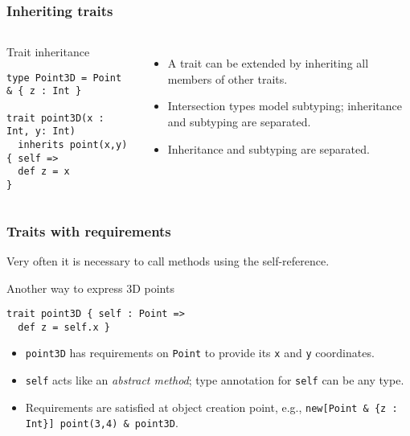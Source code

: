 \documentclass{beamer}
\begin{document}
\begin{frame}[fragile]
  \frametitle{Inheriting traits}

\begin{columns}[t]

\begin{exampleblock}{Trait inheritance}
\begin{lstlisting}
type Point3D = Point & { z : Int }

trait point3D(x : Int, y: Int)
  inherits point(x,y) { self =>
  def z = x
}
\end{lstlisting}

\end{exampleblock}




\begin{itemize}
\item A trait can be extended by inheriting all members of other traits.
\item Intersection types model subtyping; inheritance and subtyping are
  separated.
\item Inheritance and subtyping are separated.
\end{itemize}


\end{columns}


\end{frame}


\begin{frame}[fragile]
  \frametitle{Traits with requirements}

  Very often it is necessary to call methods using the self-reference.


  \begin{exampleblock}{Another way to express 3D points}
\begin{lstlisting}
trait point3D { self : Point =>
  def z = self.x }
\end{lstlisting}

  \end{exampleblock}

  \begin{itemize}
  \item \lstinline{point3D} has requirements on \lstinline{Point} to provide its
    \lstinline$x$ and \lstinline$y$ coordinates.
  \item \lstinline{self} acts like an \textit{abstract method}; type annotation
    for \lstinline{self} can be any type.
  \item Requirements are satisfied at object creation point, e.g., \lstinline$new[Point & {z : Int}] point(3,4) & point3D$.

  \end{itemize}


\end{frame}
\end{document}
